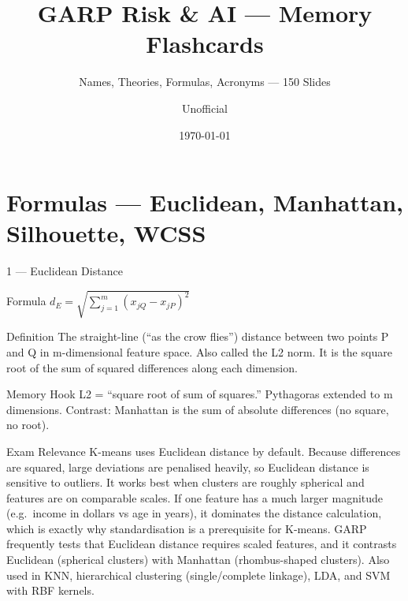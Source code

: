 \documentclass[aspectratio=169,8pt]{beamer}
\title[GARP RAI Memory]{GARP Risk \& AI --- Memory Flashcards}
\subtitle{Names, Theories, Formulas, Acronyms --- 150 Slides}
\author{Unofficial}
\date{\today}
\begin{document}
	
	\begin{frame}\titlepage\end{frame}
	
	\section{Formulas --- Euclidean, Manhattan, Silhouette, WCSS}
	
	\begin{frame}{1 --- Euclidean Distance}
		\begin{block}{Formula}
			$d_E = \sqrt{\sum_{j=1}^{m}(x_{jQ} - x_{jP})^2}$
		\end{block}
		\begin{block}{Definition}
			The straight-line (``as the crow flies'') distance between two points P and Q in m-dimensional feature space. Also called the L2 norm. It is the square root of the sum of squared differences along each dimension.
		\end{block}
		\begin{block}{Memory Hook}
			L2 = ``square root of sum of squares.'' Pythagoras extended to m dimensions. Contrast: Manhattan is the sum of absolute differences (no square, no root).
		\end{block}
		\begin{block}{Exam Relevance}
			K-means uses Euclidean distance by default. Because differences are squared, large deviations are penalised heavily, so Euclidean distance is sensitive to outliers. It works best when clusters are roughly spherical and features are on comparable scales. If one feature has a much larger magnitude (e.g.\ income in dollars vs age in years), it dominates the distance calculation, which is exactly why standardisation is a prerequisite for K-means. GARP frequently tests that Euclidean distance requires scaled features, and it contrasts Euclidean (spherical clusters) with Manhattan (rhombus-shaped clusters). Also used in KNN, hierarchical clustering (single/complete linkage), LDA, and SVM with RBF kernels.
		\end{block}
	\end{frame}
	
\end{document}

